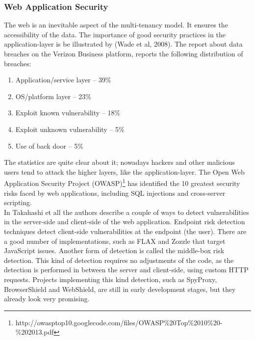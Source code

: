 \subsubsection{Web Application Security}
The web is an inevitable aspect of the multi-tenancy model. It ensures the accessibility of the data. The importance of good security practices in the application-layer is be illustrated by (Wade et al, 2008). The report about data breaches on the Verizon Business platform, reports the following distribution of breaches:\\
\begin{enumerate}
    \item Application/service layer – 39\%
    \item OS/platform layer – 23\%
    \item Exploit known vulnerability – 18\%
    \item Exploit unknown vulnerability – 5\%
    \item Use of back door – 5\%
\end{enumerate}
The statistics are quite clear about it; nowadays hackers and other malicious users tend to attack the higher layers, like the application-layer. The Open Web Application Security Project (OWASP)\footnote{http://owasptop10.googlecode.com/files/OWASP\%20Top\%2010\%20-\%202013.pdf} has identified the 10 greatest security risks faced by web applications, including SQL injections and cross-server scripting. \\
In Takahashi et all\cite{Takahashi2012Security} the authors describe a couple of ways to detect vulnerabilities in the server-side and client-side of the web application. Endpoint risk detection techniques detect client-side vulnerabilities at the endpoint (the user). There are a good number of implementations, such as FLAX and Zozzle that target JavaScript issues. Another form of detection is called the middle-box risk detection. This kind of detection requires no adjustments of the code, as the detection is performed in between the server and client-side, using custom HTTP requests. Projects implementing this kind detection, such as SpyProxy, BrowserShield and WebShield, are still in early development stages, but they already look very promising.

